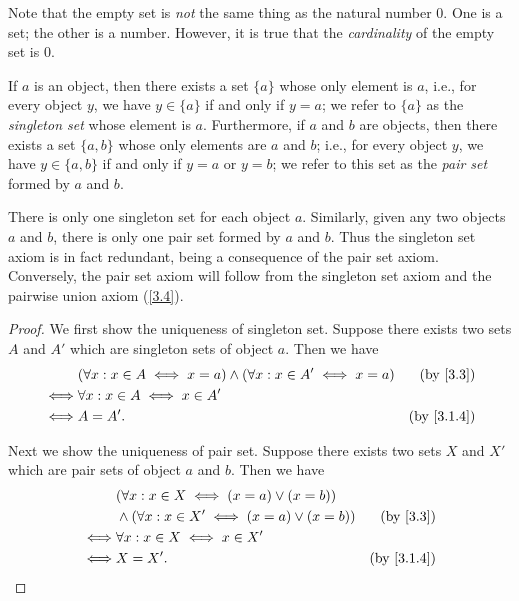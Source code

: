 \begin{remark}\label{3.1.8}
  Note that the empty set is \emph{not} the same thing as the natural number \(0\).
  One is a set;
  the other is a number.
  However, it is true that the \emph{cardinality} of the empty set is \(0\).
\end{remark}

\begin{axiom}\label{3.3}
  If \(a\) is an object, then there exists a set \(\{a\}\) whose only element is \(a\), i.e., for every object \(y\), we have \(y \in \{a\}\) if and only if \(y = a\);
  we refer to \(\{a\}\) as the \emph{singleton set} whose element is \(a\).
  Furthermore, if \(a\) and \(b\) are objects, then there exists a set \(\{a, b\}\) whose only elements are \(a\) and \(b\);
  i.e., for every object \(y\), we have \(y \in \{a, b\}\) if and only if \(y = a\) or \(y = b\);
  we refer to this set as the \emph{pair set} formed by \(a\) and \(b\).
\end{axiom}

\begin{remark}\label{3.1.9}
  There is only one singleton set for each object \(a\).
  Similarly, given any two objects \(a\) and \(b\), there is only one pair set formed by \(a\) and \(b\).
  Thus the singleton set axiom is in fact redundant, being a consequence of the pair set axiom.
  Conversely, the pair set axiom will follow from the singleton set axiom and the pairwise union axiom (\cref{3.4}).
\end{remark}

\begin{proof}
  We first show the uniqueness of singleton set.
  Suppose there exists two sets \(A\) and \(A'\) which are singleton sets of object \(a\).
  Then we have
  \begin{align*}
         & (\forall x : x \in A \iff x = a) \land (\forall x : x \in A' \iff x = a) & \text{(by \cref{3.3})}   \\
    \iff & \forall x : x \in A \iff x \in A'                                                                   \\
    \iff & A = A'.                                                                  & \text{(by \cref{3.1.4})}
  \end{align*}

  Next we show the uniqueness of pair set.
  Suppose there exists two sets \(X\) and \(X'\) which are pair sets of object \(a\) and \(b\).
  Then we have
  \begin{align*}
         & (\forall x : x \in X \iff (x = a) \lor (x = b))                                   \\
         & \land (\forall x : x \in X' \iff (x = a) \lor (x = b)) & \text{(by \cref{3.3})}   \\
    \iff & \forall x : x \in X \iff x \in X'                                                 \\
    \iff & X = X'.                                                & \text{(by \cref{3.1.4})}
  \end{align*}
\end{proof}

